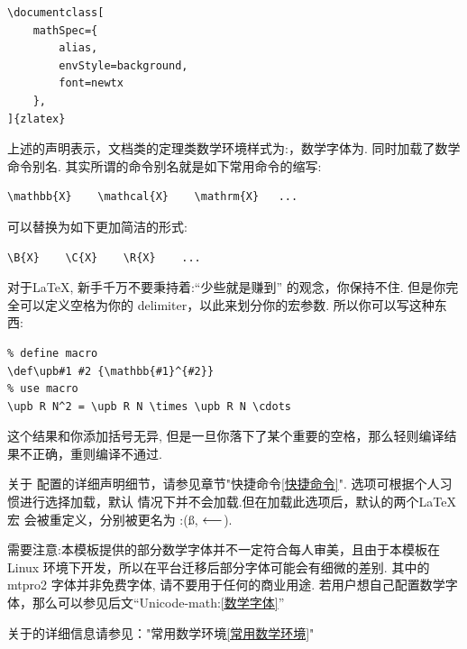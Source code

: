 \begin{verbatim}
\documentclass[
    mathSpec={
        alias,
        envStyle=background,  
        font=newtx
    },
]{zlatex}
\end{verbatim}

上述的声明表示，文档类的定理类数学环境样式为:，数学字体为. 同时加载了数学命令别名.
其实所谓的命令别名就是如下常用命令的缩写:
\begin{verbatim}
\mathbb{X}    \mathcal{X}    \mathrm{X}   ...
\end{verbatim}

可以替换为如下更加简洁的形式:
\begin{verbatim}
\B{X}    \C{X}    \R{X}    ...
\end{verbatim}

对于\LaTeX{}, 新手千万不要秉持着:``少些就是赚到'' 的观念，你保持不住. 但是你完全可以定义空格为你的 delimiter，以此来划分你的宏参数. 
所以你可以写这种东西:
\begin{verbatim}
% define macro
\def\upb#1 #2 {\mathbb{#1}^{#2}}
% use macro
\upb R N^2 = \upb R N \times \upb R N \cdots
\end{verbatim}

这个结果和你添加括号无异, 但是一旦你落下了某个重要的空格，那么轻则编译结果不正确，重则编译不通过.

关于  配置的详细声明细节，请参见章节"快捷命令\cref{快捷命令}".  选项可根据个人习惯进行选择加载，默认
情况下并不会加载.但在加载此选项后，默认的两个\LaTeX{} 宏 \cmd{\S, \ll} 会被重定义，分别被更名为 \cmd{\ss, \LL}:(\ss, $\LL$). 

需要注意:本模板提供的部分数学字体并不一定符合每人审美，且由于本模板在 Linux 环境下开发，所以在平台迁移后部分字体可能会有细微的差别.
其中的 {mtpro2} 字体并非免费字体, 请不要用于任何的商业用途. 若用户想自己配置数学字体，那么可以参见后文``Unicode-math:\cref{数学字体}''

\begin{remark}
关于的详细信息请参见："常用数学环境\cref{常用数学环境}"
\end{remark}

